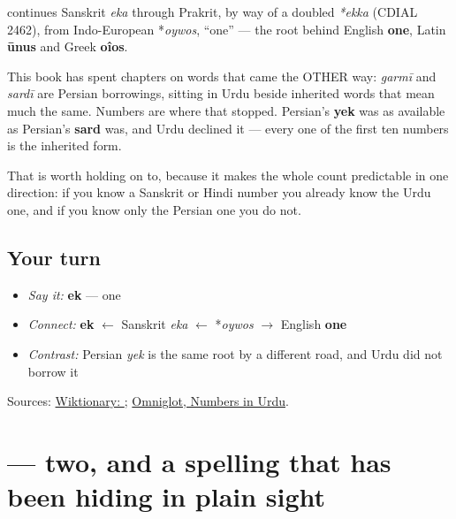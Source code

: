 \begin{cousinweb}
\textbf{} continues Sanskrit \emph{eka} through Prakrit, by way of a doubled \emph{*ekka} (CDIAL 2462), from Indo-European *\emph{oywos}, \textquotedblleft{}one\textquotedblright{} — the root behind English \textbf{one}, Latin \textbf{ūnus} and Greek \textbf{oîos}.

This book has spent chapters on words that came the OTHER way: \emph{garmī} and \emph{sardī} are Persian borrowings, sitting in Urdu beside inherited words that mean much the same. Numbers are where that stopped. Persian's \textbf{yek} was as available as Persian's \textbf{sard} was, and Urdu declined it — every one of the first ten numbers is the inherited form.

That is worth holding on to, because it makes the whole count predictable in one direction: if you know a Sanskrit or Hindi number you already know the Urdu one, and if you know only the Persian one you do not.
\end{cousinweb}

\subsection*{Your turn}
\begin{itemize}
\raggedright
  \item \emph{Say it:} \textbf{ek} — one
  \item \emph{Connect:} \textbf{ek} $\leftarrow$ Sanskrit \emph{eka} $\leftarrow$ *\emph{oywos} $\to$ English \textbf{one}
  \item \emph{Contrast:} Persian \emph{yek} is the same root by a different road, and Urdu did not borrow it
\end{itemize}

\begin{tcolorbox}[breakable,colback=teal!4,colframe=teal!35!black,title={Before you move on}]
Sources: \href{https://en.wiktionary.org/wiki/\%D8\%A7\%DB\%8C\%DA\%A9}{Wiktionary: }; \href{https://www.omniglot.com/language/numbers/urdu.htm}{Omniglot, Numbers in Urdu}.
\end{tcolorbox}
\section[\texorpdfstring{\ur{دو} (do)}{دو (do)}]{ — two, and a spelling that has been hiding in plain sight}

\label{lesson:UR-C28-do}



